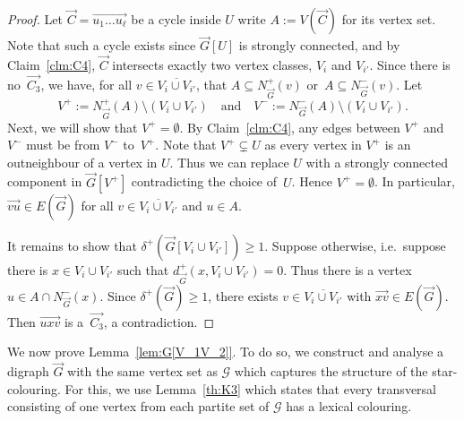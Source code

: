 \documentclass[a4paper, 12pt]{article}
\numberwithin{equation}{section}
\def\sm{{\setminus}}
\newcommand{\ova}[1]{\overrightarrow{#1}}
\newcommand{\ms}[1]{\mathscr{#1}}
\begin{document}
\begin{proof}
Let $\ova{C} = \ova{u_1 \dots u_{\ell}}$ be a cycle inside $U$ write $A := V(\ova{C})$ for its vertex set.
Note that such a cycle exists since $\ova{G}[U]$ is strongly connected, and by Claim~\ref{clm:C4}, $\ova{C}$ intersects exactly two vertex classes, $V_i$ and $V_{i'}$.
Since there is no~$\ova{C_3}$, we have, for all $v \in\overline{V_i \cup V_{i'}}$, that $A \subseteq N^+_{\ova{G}}(v)$ or~$A \subseteq N^-_{\ova{G}}(v)$.
Let
$$
V^+ :=N^+_{\ova{G}}(A)\sm (V_i \cup V_{i'})
\quad\text{and}\quad
V^- := N^-_{\ova{G}}(A)\sm (V_i \cup V_{i'}).
$$
Next, we will show that $V^+ = \emptyset$.
By Claim~\ref{clm:C4}, any edges between $V^+$ and $V^-$ must be from $V^-$ to~$V^+$. 
Note that $V^+ \subsetneq U$ as every vertex in $V^+$ is an outneighbour of a vertex in $U$.
Thus we can replace $U$ with a strongly connected component in $\ova{G}[V^+]$ contradicting the choice of~$U$. 
Hence $V^+ = \emptyset$. 
In particular, 
$\ova{vu} \in E(\ova{G})$ for all $v \in \overline{V_i \cup V_{i'}}$ and $u \in A$.

It remains to show that $\delta^+(\ova{G}[V_i \cup V_{i'}]) \geq 1$.
Suppose otherwise, i.e.~suppose there is $x \in V_i \cup V_{i'}$ such that $d^+_{\ova{G}}(x, V_i \cup V_{i'}) = 0$. 
Thus there is a vertex 
$u \in A \cap N^-_{\ova{G}}(x)$.
Since $\delta^+(\ova{G}) \ge 1$, there exists $v \in \overline{V_i \cup V_{i'}}$ with $\ova{xv} \in E(\ova{G})$. 
Then $\ova{uxv}$ is a~$\ova{C_3}$, a contradiction. 
\end{proof}




We now prove Lemma~\ref{lem:G[V_1V_2]}.
To do so, we construct and analyse a digraph $\ova{G}$ with the same vertex set as $\ms{G}$ which captures the structure of the star-colouring.
For this, we use Lemma~\ref{th:K3} which states that every transversal consisting of one vertex from each partite set of $\ms{G}$ has a lexical colouring.
\end{document}
